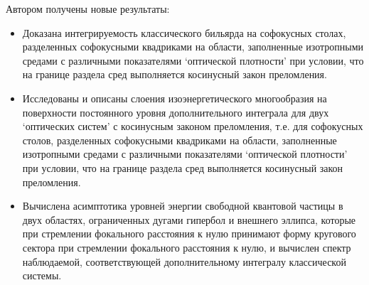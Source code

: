 {\novelty} 
Автором получены новые результаты:
  \begin{itemize}[beginpenalty=10000] %
    \item Доказана интегрируемость классического бильярда на софокусных столах, разделенных софокусными квадриками на области, заполненные изотропными средами с различными показателями `оптической плотности' при условии, что на границе раздела сред выполняется косинусный закон преломления.
    \item Исследованы и описаны слоения изоэнергетического многообразия на поверхности постоянного уровня дополнительного интеграла для двух `оптических систем' с косинусным законом преломления, т.е. для софокусных столов, разделенных софокусными квадриками на области, заполненные изотропными средами с различными показателями `оптической плотности'  при условии, что на границе раздела сред выполняется косинусный закон преломления.
   \item Вычислена асимптотика уровней энергии свободной квантовой частицы в двух областях, ограниченных дугами гипербол и внешнего эллипса, которые при стремлении фокального расстояния к нулю принимают форму кругового сектора при стремлении фокального расстояния к нулю, и вычислен спектр наблюдаемой, соответствующей дополнительному интегралу классической системы.
  \end{itemize}


